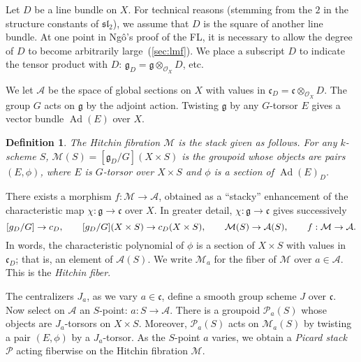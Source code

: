 \documentclass[brochure,english,12pt]{bourbaki}
\theoremstyle{plain}
\newtheorem{definition}[equation]{Definition}
\def\op#1{{\operatorname{#1}}}
\def\sl{\mathfrak{sl}}
\def\g{\mathfrak{g}}
\def\cc{\mathfrak{c}}
\def\A{{\mathcal A}}
\def\M{{\mathcal M}}
\def\P{{\mathcal P}}
\def\O{{\mathcal O}}
\begin{document}
Let $D$ be a line bundle on $X$. For technical reasons (stemming from
the $2$ in the structure constants of $\sl_2$), we assume that $D$ is
the square of another line bundle.  At one point in Ng\^o's proof of
the FL, it is necessary to allow the degree of $D$ to become
arbitrarily large~(\ref{sec:lmf}).  We place a subscript $D$ to
indicate the tensor product with $D$: $\g_D = \g\otimes_{\O_X}\!\!D$,
etc.

We let $\A$ be the space of global sections on $X$ with values in
$\cc_D=\cc\otimes_{\O_X}\!\!D$.  The group $G$ acts on $\g$ by the
adjoint action.  Twisting $\g$ by any $G$-torsor $E$ gives a
vector bundle $\op{Ad}(E)$ over $X$.

\begin{definition}
  The {\it Hitchin fibration} $\M$ is the stack given as follows.  For any
  $k$-scheme $S$, $\M(S)=[\g_D/G](X\times S)$ is the groupoid whose
  objects are pairs $(E,\phi)$, where $E$ is $G$-torsor over $X\times
  S$ and $\phi$ is a section of $\op{Ad}(E)_D$.
\end{definition}


There exists a morphism $f:\M\to\A$, obtained as a ``stacky''
enhancement of the characteristic map $\chi:\g\to\cc$ over $X$.  In
greater detail, $\chi:\g\to\cc$ gives successively
\[
 \hbox{}[\g_D/G]\to \cc_D,\qquad
 \hbox{}[\g_D/G](X\times S)  \to \cc_D(X\times S), \qquad
 \M(S) \to \A(S), \qquad
f:\M \to \A.
\]
In words, the characteristic polynomial of $\phi$ is a section of
$X\times S$ with values in $\cc_D$; that is, an element of $\A(S)$.
We write $\M_a$ for the fiber of $\M$ over $a\in \A$.  This is the {\it Hitchin fiber}.

The centralizers $J_a$, as we vary $a\in \cc$, define a smooth group
scheme $J$ over $\cc$.  Now select on $\A$ an $S$-point: $a:S\to\A$.
There is a groupoid $\P_a(S)$ whose objects are $J_a$-torsors on
$X\times S$.  Moreover, $\P_a(S)$ acts on $\M_a(S)$ by twisting a pair
$(E,\phi)$ by a $J_a$-torsor.  As the $S$-point $a$ varies, we obtain
a {\it Picard stack} $\P$ acting fiberwise on the Hitchin fibration $\M$.  
\end{document}

